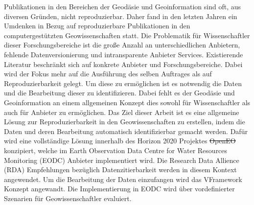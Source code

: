 \documentclass[draft,final]{vutinfth} %
\providecommand{\DIFaddtex}[1]{{\protect\color{blue}\uwave{#1}}} %
\providecommand{\DIFdeltex}[1]{{\protect\color{red}\sout{#1}}}                      %
\providecommand{\DIFaddbegin}{} %
\providecommand{\DIFaddend}{} %
\providecommand{\DIFdelbegin}{} %
\providecommand{\DIFdelend}{} %
\providecommand{\DIFadd}[1]{\texorpdfstring{\DIFaddtex{#1}}{#1}} %
\providecommand{\DIFdel}[1]{\texorpdfstring{\DIFdeltex{#1}}{}} %
\begin{document}
\begin{kurzfassung}
Publikationen in den Bereichen der Geodäsie und Geoinformation sind oft, aus diversen Gründen, nicht reproduzierbar. Daher fand in den letzten Jahren ein Umdenken in Bezug auf reproduzierbare Publikationen in den computergestützten Geowissenschaften statt. Die Problematik für Wissenschaftler dieser Forschungsbereiche ist die große Anzahl an unterschiedlichen Anbietern, fehlende Datenversionierung und intransparente Anbieter Services. Existierende Literatur beschränkt sich auf konkrete Anbieter und Forschungsbereiche. Dabei wird der Fokus mehr auf die Ausführung des selben Auftrages als auf Reproduzierbarkeit gelegt. Um diese zu ermöglichen ist es notwendig die Daten und die Bearbeitung dieser zu identifizieren. Dabei fehlt es der Geodäsie und Geoinformation an einem allgemeinen Konzept dies sowohl für Wissenschaftler als auch für Anbieter zu ermöglichen. Das Ziel dieser Arbeit ist es eine allgemeine Lösung zur Reproduzierbarkeit in den Geowissenschaften zu erstellen, indem die Daten und deren Bearbeitung automatisch identifizierbar gemacht werden. Dafür wird eine vollständige Lösung innerhalb des Horizon 2020 Projektes \DIFdelbegin \DIFdel{OpenEO }\DIFdelend \DIFaddbegin \DIFadd{openEO }\DIFaddend konzipiert, welche im Earth Observation Data Centre for Water Resources Monitoring (EODC) Anbieter implementiert wird. Die Research Data Allience (RDA) Empfehlungen bezüglich Datenzitierbarkeit werden in diesem Kontext angewendet. Um die Bearbeitung der Daten einzufangen wird das VFramework Konzept angewandt. Die Implementierung in EODC wird über vordefinierter Szenarien für Geowissenschaftler evaluiert.    
\end{kurzfassung}
\end{document}
